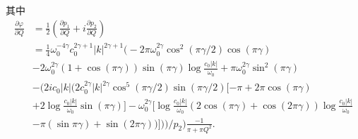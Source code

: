 \vspace{5.0cm}
其中
    \begin{equation}
        \begin{aligned}
            \frac{\partial \varphi}{\partial Q} &= \frac{1}{2}(\frac{\partial p_1}{\partial
        Q}+i\frac{\partial p_2}{\partial Q}) \\
        &= \frac{1}{4}\omega_0^{-4\gamma}c_0^{2\gamma+1}|k|^{2\gamma+1}
         \Bigg(-2\pi\omega_0^{2\gamma}\cos^2(\pi\gamma/2)\cos(\pi\gamma)\\
         &-2\omega_0^{2\gamma}(1+\cos(\pi\gamma))\sin(\pi\gamma)\log\frac{c_0|k|}{\omega_0}
         +\pi\omega_0^{2\gamma}\sin^2(\pi\gamma) \\
         &-\bigg(2ic_0|k|\Big(2c_0^{2\gamma}|k|^{2\gamma}\cos^5(\pi\gamma/2)\sin(\pi\gamma/2)[-\pi
       + 2\pi\cos(\pi\gamma)\\
   &+2\log\frac{c_0|k|}{\omega_0}\sin(\pi\gamma)] -
       \omega_0^{2\gamma}[\log\frac{c_0|k|}{\omega_0} 
       (2\cos(\pi\gamma)+\cos(2\pi\gamma))\log\frac{c_0|k|}{\omega_0}\\
   &-\pi(\sin\pi\gamma)+\sin(2\pi\gamma))]
       \Big)\bigg)/p_2\Bigg)\frac{-1}{\pi+\pi Q^2}.
    \end{aligned}
    \end{equation}



